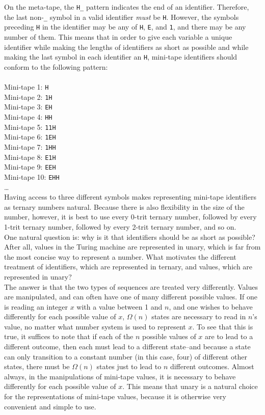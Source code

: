 \documentclass{report}
\begin{document}
On the meta-tape, the \texttt{H\_} pattern indicates the end of an identifier. Therefore, the last non-\texttt{\_} symbol in a valid identifier \emph{must} be \texttt{H}. However, the symbols preceding \texttt{H} in the identifier may be any of \texttt{H}, \texttt{E}, and \texttt{1}, and there may be any number of them. This means that in order to give each variable a unique identifier while making the lengths of identifiers as short as possible and while making the last symbol in each identifier an \texttt{H}, mini-tape identifiers should conform to the following pattern: \\ \\
Mini-tape 1: \texttt{H} \\
Mini-tape 2: \texttt{1H} \\
Mini-tape 3: \texttt{EH} \\
Mini-tape 4: \texttt{HH} \\
Mini-tape 5: \texttt{11H} \\
Mini-tape 6: \texttt{1EH} \\
Mini-tape 7: \texttt{1HH} \\
Mini-tape 8: \texttt{E1H} \\
Mini-tape 9: \texttt{EEH} \\
Mini-tape 10: \texttt{EHH} \\
\dots \\

Having access to three different symbols makes representing mini-tape identifiers as ternary numbers natural. Because there is also flexibility in the size of the number, however, it is best to use every 0-trit ternary number, followed by every 1-trit ternary number, followed by every 2-trit ternary number, and so on. \\

One natural question is: why is it that identifiers should be as short as possible? After all, values in the Turing machine are represented in unary, which is far from the most concise way to represent a number. What motivates the different treatment of identifiers, which are represented in ternary, and values, which are represented in unary? \\

The answer is that the two types of sequences are treated very differently. Values are manipulated, and can often have one of many different possible values. If one is reading an integer $x$ with a value between 1 and $n$, and one wishes to behave differently for each possible value of $x$, $\Omega(n)$ states are necessary to read in $n$'s value, no matter what number system is used to represent $x$. To see that this is true, it suffices to note that if each of the $n$ possible values of $x$ are to lead to a different outcome, then each must lead to a different state--and because a state can only transition to a constant number (in this case, four) of different other states, there must be $\Omega(n)$ states just to lead to $n$ different outcomes. Almost always, in the manipulations of mini-tape values, it is necessary to behave differently for each possible value of $x$. This means that unary is a natural choice for the representations of mini-tape values, because it is otherwise very convenient and simple to use. \\
\end{document}
